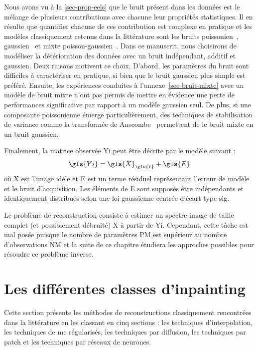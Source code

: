 Nous avons vu à la \cref{sec-prop-eels} que le bruit présent dans les données est le mélange de plusieurs contributions avec chacune leur propriétés statistiques. Il en résulte que quantifier chacune de ces contribution est complexe en pratique et les modèles classiquement retenus dans la littérature sont les bruits poissonien~\cite{egerton2011electron, mevenkamp2015poisson, stevens2018apl}, gaussien~\cite{stevens2014potential, binev2012compressed} et mixte poisson-gaussien~\cite{sanders2020inpainting}. Dans ce manuscrit, nous choisirons de modéliser la détérioration des données avec un bruit indépendant, additif et gaussien. Deux raisons motivent ce choix. D'abord, les paramètres du bruit sont difficiles à caractériser en pratique, si bien que le bruit gaussien plus simple est préféré. Ensuite, les expériences conduites à l'annexe~\ref{sec-bruit-mixte} avec un modèle de bruit mixte n'ont pas permis de mettre en évidence une perte de performances significative par rapport à un modèle gaussien seul. De plus, si une composante poissonienne émerge particulièrement, des techniques de stabilisation de variance comme la transformée de Anscombe~\cite{anscombe1948transformation} permettent de  le bruit mixte en un bruit gaussien.

Finalement, la matrice observée \gls{Yi} peut être décrite par le modèle suivant :
\begin{equation}
    \gls{Yi} = \gls{X}_{\gls{I}} + \gls{E}
\end{equation}
où \gls{X} est l'image idéle et \gls{E} est un terme résiduel représentant l'erreur de modèle et le bruit d'acquisition. Les éléments de \gls{E} sont supposés être indépendants et identiquement distribués selon une loi gaussienne centrée d'écart type \gls{sig}.

Le problème de reconstruction consiste à estimer un spectre-image de taille  complet (et possiblement débruité) \gls{X} à partir de \gls{Yi}. Cependant, cette tâche est mal posée puisque le nombre de paramètres \gls{P}\gls{M} est supérieur au nombre d'observations \gls{N}\gls{M} et la suite de ce chapitre étudiera les approches possibles pour résoudre ce problème inverse.


%
\section{Les différentes classes d'inpainting}

Cette section présente les méthodes de reconstructions classiquement rencontrées dans la littérature en les classant en cinq sections : les techniques d'interpolation, les techniques de \gls{mc} régularisés, les techniques par diffusion, les techniques par patch et les techniques par réseaux de neurones.


